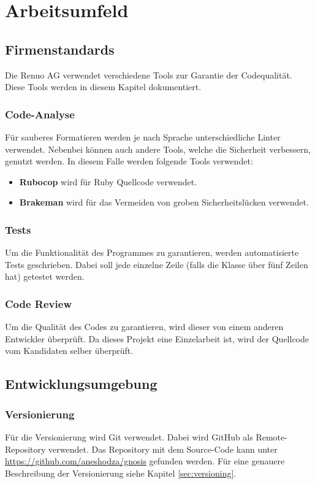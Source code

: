 \chapter{Arbeitsumfeld}

\section{Firmenstandards}
Die Renuo AG verwendet verschiedene Tools zur Garantie der Codequalität. Diese Tools werden in diesem Kapitel dokumentiert.
\subsection{Code-Analyse}
Für sauberes Formatieren werden je nach Sprache unterschiedliche \gls{Linter} verwendet. Nebenbei können auch andere Tools, welche die Sicherheit verbessern, genutzt werden. In diesem Falle werden folgende Tools verwendet:
\begin{itemize}
    \item \textbf{Rubocop} wird für Ruby Quellcode verwendet.
    \item \textbf{Brakeman} wird für das Vermeiden von groben Sicherheitslücken verwendet.
\end{itemize}
\subsection{Tests}
Um die Funktionalität des Programmes zu garantieren, werden automatisierte Tests geschrieben. Dabei soll jede einzelne Zeile (falls die Klasse über fünf Zeilen hat) getestet werden.
\subsection{Code Review}
Um die Qualität des Codes zu garantieren, wird dieser von einem anderen Entwickler überprüft. Da dieses Projekt eine Einzelarbeit ist, wird der Quellcode vom Kandidaten selber überprüft.

\section{Entwicklungsumgebung}
\subsection{Versionierung}
Für die Versionierung wird Git verwendet. Dabei wird GitHub als Remote-Repository verwendet. Das Repository mit
dem Source-Code kann unter \url{https://github.com/aneshodza/gnosis} gefunden werden. Für eine genauere Beschreibung
der Versionierung siehe Kapitel \ref{sec:versioning}.
